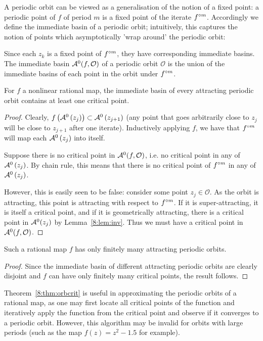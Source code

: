\documentclass[../main.tex]{subfiles}
\begin{document}
A periodic orbit can be viewed as a generalisation of the notion of a fixed point: a periodic point of $f$ of period $m$ is a fixed point of the iterate $f^{\circ m}$. Accordingly we define the immediate basin of a periodic orbit; intuitively, this captures the notion of points which asymptotically 'wrap around' the periodic orbit:

\begin{dfn}
    \label{8:dfn:orbbasin}
    Since each $z_k$ is a fixed point of $f^{\circ m}$, they have corresponding immediate basins. The immediate basin $\mathcal{A}^0(f, \mathcal{O})$ of a periodic orbit $\mathcal{O}$ is the union of the immediate basins of each point in the orbit under $f^{\circ m}$.
\end{dfn}

\begin{thm}
    \label{8:thm:orbcrit} 
    For $f$ a nonlinear rational map, the immediate basin of every attracting periodic orbit contains at least one critical point.
\end{thm}

\begin {proof}
Clearly, $f\left(\mathcal{A}^{0}\left(z_{j}\right)\right) \subset \mathcal{A}^{0}\left(z_{j+1}\right)$ (any point that goes arbitrarily close to $z_j$ will be close to $z_{j+1}$ after one iterate). Inductively applying $f$, we have that $f^{\circ m}$ will map each $\mathcal{A}^{0}\left(z_{j}\right)$ into itself. 

Suppose there is no critical point in $\mathcal{A}^{0}(f, \mathcal{O})$, i.e. no critical point in any of $\mathcal{A}^{0}\left(z_{j}\right)$. By chain rule, this means that there is no critical point of $f^{\circ m}$ in any of  $\mathcal{A}^{0}\left(z_{j}\right)$. 

However, this is easily seen to be false: consider some point $z_j\in\mathcal{O}$. As the orbit is attracting, this point is attracting with respect to $f^{\circ m}$. If it is super-attracting, it is itself a critical point, and if it is geometrically attracting, there is a critical point in $\mathcal{A}^{0}(z_j)$ by Lemma~\ref{8:lem:inv}. Thus we must have a critical point in $\mathcal{A}^{0}(f, \mathcal{O})$.
\end{proof}

\begin{cor}
    \label{8:cor:orbfin}
    Such a rational map $f$ has only finitely many attracting periodic orbits.
\end{cor}

\begin {proof}
    Since the immediate basin of different attracting periodic orbits are clearly disjoint and $f$ can have only finitely many critical points, the result follows.
\end{proof}
\begin{rmk}
    \label{8:rmk:uful}
    Theorem~\ref{8:thm:orbcrit} is useful in approximating the periodic orbits of a rational map, as one may first locate all critical points of the function and iteratively apply the function from the critical point and observe if it converges to a periodic orbit. However, this algorithm may be invalid for orbits with large periods (such as the map $f(z)=z^{2}-1.5$ for example).
\end{rmk}
\end{document}
